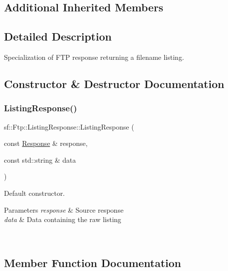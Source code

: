 \subsection*{Additional Inherited Members}


\subsection{Detailed Description}
Specialization of F\+TP response returning a filename listing. 

\subsection{Constructor \& Destructor Documentation}
\mbox{\label{classsf_1_1_ftp_1_1_listing_response_a7e98d0aed70105c71adb52e5b6ce0bb8}} 
\subsubsection{\texorpdfstring{ListingResponse()}{ListingResponse()}}
{\footnotesize\ttfamily sf\+::\+Ftp\+::\+Listing\+Response\+::\+Listing\+Response (\begin{DoxyParamCaption}\item[{const \mbox{\hyperlink{classsf_1_1_ftp_1_1_response}{Response}} \&}]{response,  }\item[{const std\+::string \&}]{data }\end{DoxyParamCaption})}



Default constructor. 


\begin{DoxyParams}{Parameters}
{\em response} & Source response \\
\hline
{\em data} & Data containing the raw listing \begin{DoxyVerb}\end{DoxyVerb}
 \\
\hline
\end{DoxyParams}


\subsection{Member Function Documentation}
\mbox{\label{classsf_1_1_ftp_1_1_listing_response_a6cdcdfcc6a9008c7e1eddb48b164793d}} 
